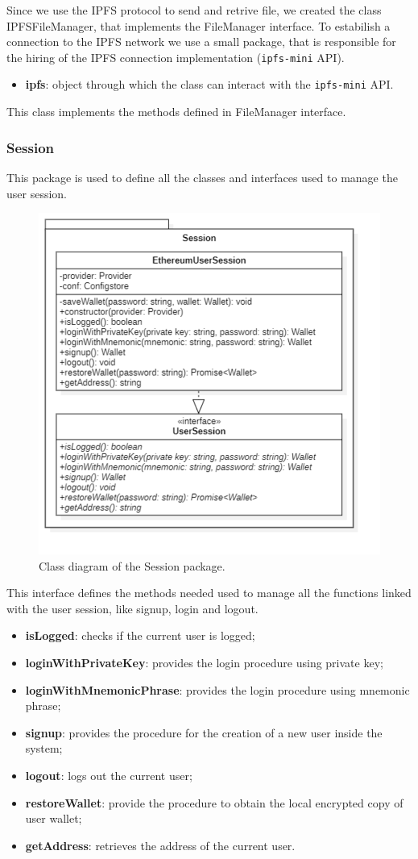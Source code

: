 				Since we use the IPFS protocol to send and retrive file, we created the class IPFSFileManager, that implements the FileManager interface. To estabilish a connection to the IPFS network we use a small package, that is responsible for the hiring of the IPFS connection implementation (\texttt{ipfs-mini} API). 
				
				\begin{itemize}
					\item \textbf{ipfs}: object through which the class can interact with the \texttt{ipfs-mini} API.
				\end{itemize}
				
				This class implements the methods defined in FileManager interface. 
	
		\subsubsection{Session} 
		This package is used to define all the classes and interfaces used to manage the user session.
		\begin{figure} [h!]
			\centering
			\includegraphics[width=0.5\linewidth]{diagrammi/etherless-cli/Session}
			\caption{Class diagram of the Session package.}
		\end{figure}
			
			This interface defines the methods needed used to manage all the functions linked with the user session, like signup, login and logout. 
				\begin{itemize}
					\item \textbf{isLogged}: checks if the current user is logged;
					\item \textbf{loginWithPrivateKey}: provides the login procedure using private key;
					\item \textbf{loginWithMnemonicPhrase}: provides the login procedure using mnemonic phrase;
					\item \textbf{signup}: provides the procedure for the creation of a new user inside the system;
					\item \textbf{logout}: logs out the current user;
					\item \textbf{restoreWallet}: provide the procedure to obtain the local encrypted copy of user wallet;
					\item \textbf{getAddress}: retrieves the address of the current user.
				\end{itemize}
			
